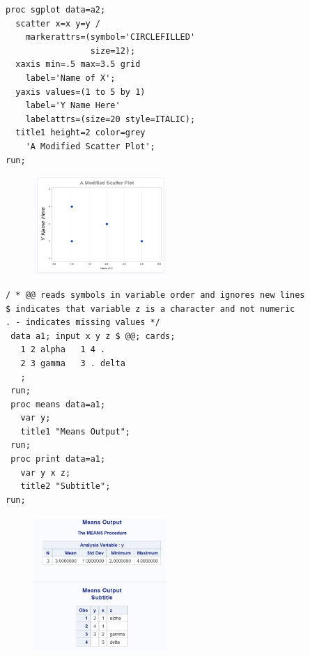 \documentclass[12pt]{../notes}
\begin{document}
\begin{verbatim}
proc sgplot data=a2;
  scatter x=x y=y /
    markerattrs=(symbol='CIRCLEFILLED'
                 size=12);
  xaxis min=.5 max=3.5 grid
    label='Name of X';
  yaxis values=(1 to 5 by 1) 
    label='Y Name Here'
    labelattrs=(size=20 style=ITALIC);
  title1 height=2 color=grey 
    'A Modified Scatter Plot';
run;
\end{verbatim}

\begin{figure}[H]
\centering
\includegraphics[width = 0.45\textwidth]{../figures/module1/sas5.png}
\end{figure}

\begin{verbatim}
/ * @@ reads symbols in variable order and ignores new lines
$ indicates that variable z is a character and not numeric 
. - indicates missing values */
 data a1; input x y z $ @@; cards;
   1 2 alpha   1 4 .
   2 3 gamma   3 . delta
   ;
 run;
 proc means data=a1;
   var y;
   title1 "Means Output";
 run;
 proc print data=a1;
   var y x z;
   title2 "Subtitle";
run;
\end{verbatim}

\begin{figure}[H]
\centering
\includegraphics[width = 0.45\textwidth]{../figures/module1/sas6.png}
\end{figure}
\end{document}
